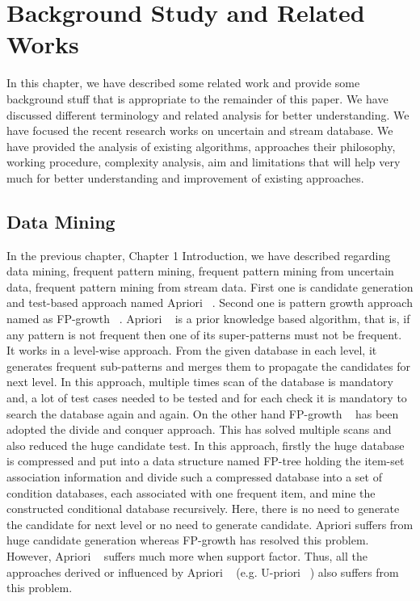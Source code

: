 %
\chapter{Background Study and Related Works}

In this chapter, we have described some related work and provide some background stuff that is appropriate to the remainder of this paper. We have discussed different terminology and related analysis for better understanding. We have focused the recent research works on uncertain and stream database. We have provided the analysis of existing algorithms, approaches their philosophy, working procedure, complexity analysis, aim and limitations that will help very much for better understanding and improvement of existing approaches.

\section{Data Mining}
In the previous chapter, Chapter 1 Introduction, we have described regarding data mining, frequent pattern mining, frequent pattern mining from uncertain data, frequent pattern mining from stream data. First one is candidate generation and test-based approach named Apriori ~\cite{apriori}. Second one is pattern growth approach named as FP-growth ~\cite{fp_growth}. Apriori ~\cite{apriori} is a prior knowledge based algorithm, that is, if any pattern is not frequent then one of its super-patterns must not be frequent. It works in a level-wise approach. From the given database in each level, it generates frequent sub-patterns and merges them to propagate the candidates for next level. In this approach, multiple times scan of the database is mandatory and, a lot of test cases needed to be tested and for each check it is mandatory to search the database again and again. On the other hand FP-growth ~\cite{fp_growth} has been adopted the divide and conquer approach. This has solved multiple scans and also reduced the huge candidate test. In this approach, firstly the huge database is compressed and put into a data structure named FP-tree holding the item-set association information and divide such a compressed database into a set of condition databases, each associated with one frequent item, and mine the constructed conditional database recursively. Here, there is no need to generate the candidate for next level or no need to generate candidate. Apriori suffers from huge candidate generation whereas FP-growth has resolved this problem. However, Apriori ~\cite{apriori} suffers much more when support factor. Thus, all the approaches derived or influenced by Apriori ~\cite{apriori} (e.g. U-priori ~\cite{u_priori}) also suffers from this problem.

